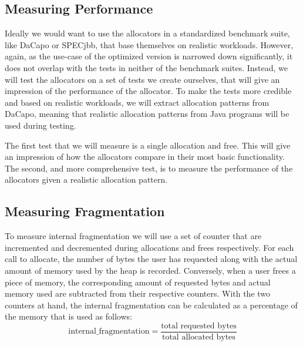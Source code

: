 \subsection{Measuring Performance}

Ideally we would want to use the allocators in a standardized benchmark suite, like DaCapo or SPECjbb, that base themselves on realistic workloads. However, again, as the use-case of the optimized version is narrowed down significantly, it does not overlap with the tests in neither of the benchmark suites. Instead, we will test the allocators on a set of tests we create ourselves, that will give an impression of the performance of the allocator. To make the tests more credible and based on realistic workloads, we will extract allocation patterns from DaCapo, meaning that realistic allocation patterns from Java programs will be used during testing.

The first test that we will measure is a single allocation and free. This will give an impression of how the allocators compare in their most basic functionality. The second, and more comprehensive test, is to measure the performance of the allocators given a realistic allocation pattern.

%



\subsection{Measuring Fragmentation}

To measure internal fragmentation we will use a set of counter that are incremented and decremented during allocations and frees respectively. For each call to allocate, the number of bytes the user has requested along with the actual amount of memory used by the heap is recorded. Conversely, when a user frees a piece of memory, the corresponding amount of requested bytes and actual memory used are subtracted from their respective counters. With the two counters at hand, the internal fragmentation can be calculated as a percentage of the memory that is used as follows:
\[
\text{internal\_fragmentation} = \frac{\text{total requested bytes}}{\text{total allocated bytes}}
\]
